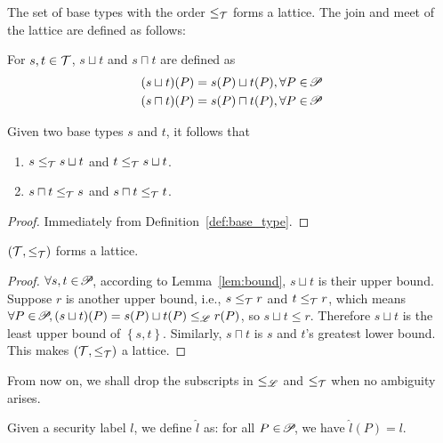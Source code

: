 {The set of base types with the order $\leq_{\mathcal{T}}$ forms a lattice. The join and meet
of the lattice are defined as follows:

\begin{definition}\label{def:type-cup-cap}
For $s, t\in\mathcal{T}$, $s\sqcup t$ and $s\sqcap t$ are defined as
{\myeqsize\begin{align*}
(s\sqcup t)(P) =  s(P)\sqcup t(P), \forall P \in \!\mathscr{P}\!\\
(s\sqcap t)(P) =  s(P)\sqcap t(P), \forall P \in \!\mathscr{P}\!
\end{align*}}
\end{definition}


\begin{lemma}\label{lem:bound}
Given two base types $s$ and $t$, it follows that
\begin{enumerate}[label*=(\alph*)]
\item $s \leq_{\mathcal{T}} s\sqcup t$ and $t\leq_{\mathcal{T}} s\sqcup t$.
\item $s\sqcap t \leq_{\mathcal{T}} s$ and $s\sqcap t \leq_{\mathcal{T}} t$.
\end{enumerate}
\end{lemma}
 \begin{proof}
Immediately from Definition~\ref{def:base_type}.
 \end{proof}


\begin{lemma}\label{lem:lattice}
$(\mathcal{T}, \leq_{\mathcal{T}})$ forms a lattice.
\end{lemma}
 \begin{proof}
 $\forall s,t\in\!\mathscr{P}\!$, according to Lemma~\ref{lem:bound}, $s \sqcup t$ is their upper bound. Suppose $r$ is another upper bound, i.e., $s\leq_{\mathcal{T}} r$ and $t\leq_{\mathcal{T}} r$, which means $\forall P\in\!\mathscr{P}\!, (s\sqcup t)(P)=s(P)\sqcup t(P)\leq_{\mathscr{L}} r(P)$, so $s\sqcup t\leq r$. Therefore $s\sqcup t$ is the least upper bound of $\left\{s,t\right\}$. Similarly, $s\sqcap t$ is $s$ and $t$'s greatest lower bound. This makes $(\mathcal{T}, \leq_{\mathcal{T}})$ a lattice.
 \end{proof}


From now on, we shall drop the subscripts in $\leq_{\mathscr{L}}$ and $\leq_{\mathcal{T}}$ when no ambiguity arises.



\begin{definition}
\label{def:embed}
Given a security label $l$, we define $\hat{l}$ as:
for all $P \in \!\mathscr{P}\!$, we have $\hat{l}(P) = l$.
\end{definition}

}
